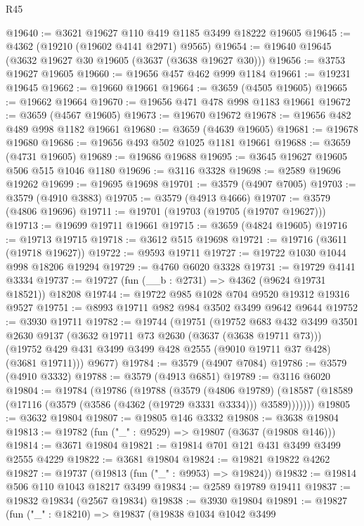 \begin{lexlean}{R45}
\begin{coremodule}
@19640 := @3621 @19627 @110 @419 @1185 @3499 @18222 @19605
@19645 := @4362 (@19210 (@19602 @4141 @2971) @9565)
@19654 := @19640 @19645 (@3632 @19627 @30 @19605 (@3637 (@3638 @19627 @30)))
@19656 := @3753 @19627 @19605
@19660 := @19656 @457 @462 @999 @1184
@19661 := @19231 @19645
@19662 := @19660 @19661
@19664 := @3659 (@4505 @19605)
@19665 := @19662 @19664
@19670 := @19656 @471 @478 @998 @1183 @19661
@19672 := @3659 (@4567 @19605)
@19673 := @19670 @19672
@19678 := @19656 @482 @489 @998 @1182 @19661
@19680 := @3659 (@4639 @19605)
@19681 := @19678 @19680
@19686 := @19656 @493 @502 @1025 @1181 @19661
@19688 := @3659 (@4731 @19605)
@19689 := @19686 @19688
@19695 := @3645 @19627 @19605 @506 @515 @1046 @1180
@19696 := @3116 @3328
@19698 := @2589 @19696 @19262
@19699 := @19695 @19698
@19701 := @3579 (@4907 @7005)
@19703 := @3579 (@4910 @3883)
@19705 := @3579 (@4913 @4666)
@19707 := @3579 (@4806 @19696)
@19711 := @19701 (@19703 (@19705 (@19707 @19627)))
@19713 := @19699 @19711 @19661
@19715 := @3659 (@4824 @19605)
@19716 := @19713 @19715
@19718 := @3612 @515 @19698
@19721 := @19716 (@3611 (@19718 @19627))
@19722 := @9593 @19711
@19727 := @19722 @1030 @1044 @998 @18206 @19294
@19729 := @4760 @6020 @3328
@19731 := @19729 @4141 @3334
@19737 := @19727 (fun (__b : @2731) => @4362 (@9624 @19731 @18521)) @18208
@19744 := @19722 @985 @1028 @704 @9520 @19312 @19316 @9527
@19751 := @8993 @19711 @982 @984 @3502 @3499 @9642 @9644
@19752 := @3930 @19711
@19782 := @19744
    (@19751
      (@19752
        @683
        @432
        @3499
        @3501
        @2630
        @9137
        (@3632 @19711 @73 @2630 (@3637 (@3638 @19711 @73)))
        (@19752 @429 @431 @3499 @3499 @428 @2555 (@9010 @19711 @37 @428) (@3681 @19711)))
      @9677)
@19784 := @3579 (@4907 @7084)
@19786 := @3579 (@4910 @3332)
@19788 := @3579 (@4913 @6851)
@19789 := @3116 @6020
@19804 := @19784
    (@19786
      (@19788
        (@3579
          (@4806 @19789)
          (@18587 (@18589 (@17116 (@3579 (@3586 (@4362 (@19729 @3331 @3334))) @3589)))))))
@19805 := @3632 @19804
@19807 := @19805 @146 @3332
@19808 := @3638 @19804
@19813 := @19782 (fun ("_" : @9529) => @19807 (@3637 (@19808 @146)))
@19814 := @3671 @19804
@19821 := @19814 @701 @121 @431 @3499 @3499 @2555 @4229
@19822 := @3681 @19804
@19824 := @19821 @19822 @4262
@19827 := @19737 (@19813 (fun ("_" : @9953) => @19824))
@19832 := @19814 @506 @110 @1043 @18217 @3499
@19834 := @2589 @19789 @19411
@19837 := @19832 @19834 (@2567 @19834)
@19838 := @3930 @19804
@19891 := @19827
    (fun ("_" : @18210) =>
    @19837
      (@19838
        @1034
        @1042
        @3499

\end{coremodule}
\end{lexlean}
